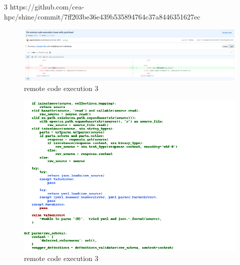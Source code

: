 \documentclass[
a4paper,
pagesize,
pdftex,
12pt,
twoside, %
BCOR=5mm, %
ngerman,
fleqn,
final,
]{scrartcl}
\begin{document}
3 https://github.com/cea-hpc/shine/commit/7ff203be36e439b535894764c37a8446351627ec


\begin{figure}[h]
	\centering
	\includegraphics[width=\linewidth]{Images/remote_code_execution3}
	\caption{remote code execution 3}
	\label{fig:remote_code_execution3}
\end{figure}
\begin{figure}[h]
	\centering
	\includegraphics[width=\linewidth]{Images/remote_code_execution3r}
	\caption{remote code execution 3}
	\label{fig:remote_code_execution3r}
\end{figure}
		

	
	
	
	
	
	
	
	
	
	
\end{document}
